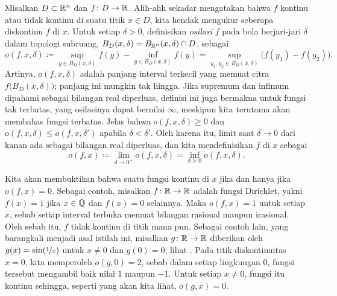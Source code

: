 Misalkan $D \subset {\mathbb{R}}^n$ dan $f \colon D \to {\mathbb{R}}$.
Alih-alih sekadar mengatakan bahwa $f$ kontinu atau tidak kontinu di
suatu titik $x \in D$,
kita hendak mengukur seberapa diskontinu $f$ di $x$.
Untuk setiap $\delta > 0$, definisikan \emph{osilasi}
$f$ pada bola berjari-jari $\delta$ dalam topologi subruang,
$B_D(x,\delta) = B_{{\mathbb{R}}^n}(x,\delta) \cap D$, sebagai
\begin{equation*}
o(f,x,\delta) \coloneqq
{\sup_{y \in B_D(x,\delta)} f(y)}
-
{\inf_{y \in B_D(x,\delta)} f(y)}
= 
\sup_{y_1,y_2 \in B_D(x,\delta)} \bigl(f(y_1)-f(y_2)\bigr) .
\end{equation*}
Artinya, $o(f,x,\delta)$ adalah panjang interval terkecil yang memuat citra
$f\bigl(B_D(x,\delta)\bigr)$; panjang ini mungkin tak hingga.
Jika supremum dan infimum dipahami sebagai bilangan real diperluas,
definisi ini juga bermakna untuk fungsi tak terbatas, yang osilasinya dapat
bernilai $\infty$, meskipun kita terutama akan membahas fungsi terbatas.
Jelas bahwa $o(f,x,\delta) \geq 0$ dan
$o(f,x,\delta) \leq o(f,x,\delta')$ apabila $\delta < \delta'$.
Oleh karena itu, limit saat $\delta \to 0$ dari kanan ada sebagai bilangan
real diperluas, dan kita mendefinisikan \emph{} $f$
di $x$ sebagai
\begin{equation*}
o(f,x) \coloneqq
\lim_{\delta \to 0^+}
o(f,x,\delta) =
\inf_{\delta > 0}
o(f,x,\delta) .
\end{equation*}

Kita akan membuktikan bahwa suatu fungsi kontinu di $x$ jika dan hanya jika
$o(f,x) = 0$.
Sebagai contoh, misalkan $f \colon {\mathbb{R}} \to {\mathbb{R}}$ adalah fungsi Dirichlet, yakni
$f(x)=1$ jika $x \in {\mathbb{Q}}$ dan $f(x)=0$ selainnya. Maka $o(f,x) = 1$ untuk setiap
$x$, sebab setiap interval terbuka memuat bilangan rasional maupun irasional.
Oleh sebab itu, $f$ tidak kontinu di titik mana pun.
Sebagai contoh lain, yang barangkali menjadi asal istilah ini,
misalkan $g \colon {\mathbb{R}} \to {\mathbb{R}}$ diberikan oleh
$g(x) = \sin(\nicefrac{1}{x})$ untuk $x\neq 0$ dan $g(0)=0$;
lihat .
Pada titik diskontinuitas $x=0$, kita memperoleh $o(g,0) = 2$, sebab
dalam setiap lingkungan $0$, fungsi tersebut mengambil baik nilai $1$ maupun $-1$.
Untuk setiap $x \neq 0$, fungsi itu kontinu sehingga, seperti yang akan kita lihat,
$o(g,x) = 0$.

\begin{myfigureht}
\caption{Grafik $\sin(\nicefrac{1}{x})$.\label{fig:sin1xosc}}
\end{myfigureht}

